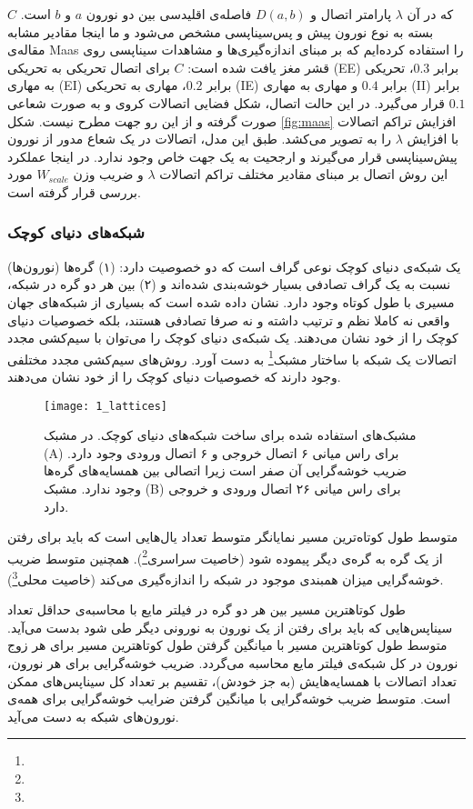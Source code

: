 که در آن $\lambda$ پارامتر اتصال و $D(a,b)$ فاصله‌ی اقلیدسی بین دو نورون $a$ و $b$ است. $C$ بسته به نوع نورون پیش و پس‌سیناپسی مشخص می‌شود و ما اینجا مقادیر مشابه مقاله‌ی Maas \cite{maass2002real} را استفاده کرده‌ایم که بر مبنای اندازه‌گیری‌ها و مشاهدات سیناپسی روی قشر مغز یافت شده است\cite{gupta2000organizing}: $C$ برای اتصال تحریکی به تحریکی (EE) برابر $0.3$، تحریکی به مهاری (EI) برابر $0.2$، مهاری به تحریکی (IE) برابر $0.4$ و مهاری به مهاری (II) برابر $0.1$ قرار می‌گیرد. در این حالت اتصال، شکل فضایی اتصالات کروی و به صورت شعاعی صورت گرفته و از این رو جهت مطرح نیست. شکل \ref{fig:maas} افزایش تراکم اتصالات با افزایش $\lambda$ را به تصویر می‌کشد. طبق این مدل، اتصالات در یک شعاع مدور از نورون پیش‌سیناپسی قرار می‌گیرند و ارجحیت به یک جهت خاص وجود ندارد. در اینجا عملکرد این روش اتصال  بر مبنای مقادیر مختلف تراکم اتصالات $\lambda$ و  ضریب وزن $W_{scale}$ مورد بررسی قرار گرفته است.

\subsubsection{شبکه‌های دنیای کوچک}
یک شبکه‌ی دنیای کوچک\cite{watts1998collective} نوعی گراف است که دو خصوصیت دارد: (۱) گره‌ها (نورون‌ها) نسبت به یک گراف تصادفی بسیار خوشه‌بندی شده‌اند و (۲) بین هر دو گره در شبکه، مسیری با طول کوتاه وجود دارد. نشان داده شده است که بسیاری از شبکه‌های جهان واقعی نه کاملا نظم و ترتیب داشته و نه صرفا تصادفی هستند، بلکه خصوصیات دنیای کوچک را از خود نشان می‌دهند. یک شبکه‌ی دنیای کوچک را می‌توان با سیم‌کشی مجدد اتصالات یک شبکه با ساختار مشبک\footnote{} به دست آورد. روش‌های سیم‌کشی مجدد مختلفی وجود دارند که خصوصیات دنیای کوچک را از خود نشان می‌دهند. 

\begin{figure}
\centering
{\footnotesize
\texttt{[image: 1\_lattices]}
\caption[مشبک‌های استفاده شده برای ساخت شبکه‌های دنیای کوچک]{مشبک‌های استفاده شده برای ساخت شبکه‌های دنیای کوچک. در مشبک (A) برای راس میانی ۶ اتصال خروجی و ۶ اتصال ورودی وجود دارد. ضریب خوشه‌گرایی آن صفر است زیرا اتصالی بین همسایه‌های گره‌ها وجود ندارد. مشبک (B) برای راس میانی ۲۶ اتصال ورودی و خروجی دارد.}
\label{fig:lattices}
}
\end{figure}

متوسط طول کوتاه‌ترین مسیر نمایانگر متوسط تعداد یال‌هایی است که باید برای رفتن از یک گره به گره‌ی دیگر پیموده شود (خاصیت سراسری\footnote{}). همچنین متوسط ضریب خوشه‌گرایی میزان همبندی موجود در شبکه را اندازه‌گیری می‌کند (خاصیت محلی\footnote{}).

طول کوتاهترین مسیر بین هر دو گره در فیلتر مایع با محاسبه‌ی حداقل تعداد سیناپس‌هایی که باید برای رفتن از یک نورون به نورونی دیگر طی شود بدست می‌آید. متوسط طول کوتاهترین مسیر با میانگین گرفتن طول کوتاهترین مسیر برای هر زوج نورون در کل شبکه‌ی فیلتر مایع محاسبه می‌گردد. ضریب خوشه‌گرایی برای هر نورون، تعداد اتصالات با همسایه‌هایش (به جز خودش)، تقسیم بر تعداد کل سیناپس‌های ممکن است. متوسط ضریب خوشه‌گرایی با میانگین گرفتن ضرایب خوشه‌گرایی برای همه‌ی نورون‌های شبکه به دست می‌آید. 

